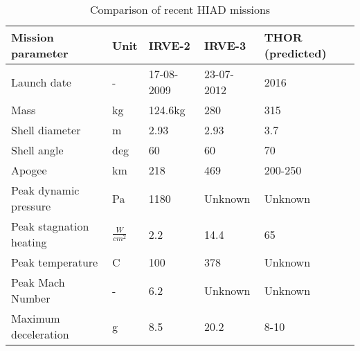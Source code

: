 \begin{table}[ht!]
\vspace{-20mm}
	\caption{Comparison of recent HIAD missions}%
		\begin{tabular}{|p{}|p{}|p{}|p{}|p{}|} %
			\hline

       Mission parameter   &       Unit &     IRVE-2 \cite{irve2} &     IRVE-3 \citep{irve3,thor} & THOR (predicted) \citep{thor} \\
			\hline \hline

Launch date &          - & 17-08-2009 & 23-07-2012 &       2016 \\
			\hline

      Mass &         kg &    124.6kg &        280 &        315 \\
			\hline

Shell diameter &          m &       2.93 &       2.93 &        3.7 \\
			\hline

Shell angle &     deg &         60 &         60 &         70 \\
			\hline

    Apogee &         km &        218 &        469 &    200-250 \\
			\hline

Peak dynamic pressure &         Pa &       1180 &   Unknown         &   Unknown         \\
			\hline

Peak stagnation heating &     $ \frac{W}{cm^{2}}$ &        2.2 &       14.4 &         65 \\
			\hline

Peak temperature &          C &        100 &        378 &      Unknown      \\
			\hline

Peak Mach Number &          - &        6.2 &  Unknown          &   Unknown         \\
			\hline

Maximum deceleration &          g &        8.5 &       20.2 &       8-10 \\
			\hline

		\end{tabular}
    \label{tab:hiadcomparison}%
\end{table}


